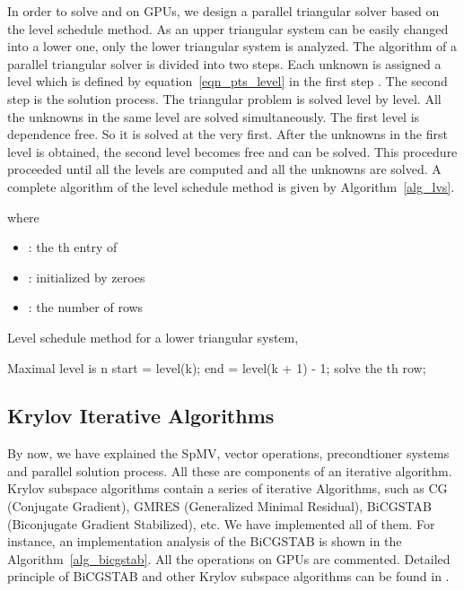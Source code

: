 \documentclass[runningheads,a4paper]{llncs}
\begin{document}
{In order to solve  and  on GPUs, we design a parallel triangular solver based on the level schedule method. As an upper triangular system can be easily changed into a lower one, only the lower triangular system is analyzed. The algorithm of a parallel triangular solver is divided into two steps. Each unknown  is assigned a level which is defined by equation~\eqref{eqn_pts_level} in the first step \cite{saad}. The second step is the solution process. The triangular problem is solved level by level. All the unknowns in the same level are solved simultaneously. The first level is dependence free. So it is solved at the very first. After the unknowns in the first level is obtained, the second level becomes free and can be solved. This procedure proceeded until all the levels are computed and all the unknowns are solved. A complete algorithm of the level schedule method is given by Algorithm~\ref{alg_lvs}.


where
\begin{itemize}\itemsep1pt \parskip0pt 
  \item : the th entry of 
  \item : initialized by zeroes
  \item : the number of rows
\end{itemize}

\begin{algorithm}\caption{Level schedule method for a lower triangular system, }
\label{alg_lvs}
\begin{algorithmic}[1]
\State Maximal level is n
  \State start = level(k);
  \State end = level(k + 1) - 1;
  \State solve the th row;
  \EndFor
\EndFor

\end{algorithmic}
\end{algorithm}

\subsection{Krylov Iterative Algorithms}
By now, we have explained the SpMV, vector operations, precondtioner systems and parallel solution process. All these are components of an iterative algorithm. Krylov subspace algorithms contain a series of iterative Algorithms, such as CG (Conjugate Gradient), GMRES (Generalized Minimal Residual), BiCGSTAB (Biconjugate Gradient Stabilized), etc. We have implemented all of them. For instance, an implementation analysis of the BiCGSTAB is shown in the Algorithm~\ref{alg_bicgstab}. All the operations on GPUs are commented. Detailed principle of BiCGSTAB and other Krylov subspace algorithms can be found in \cite{saad,template}.

}
\end{document}
